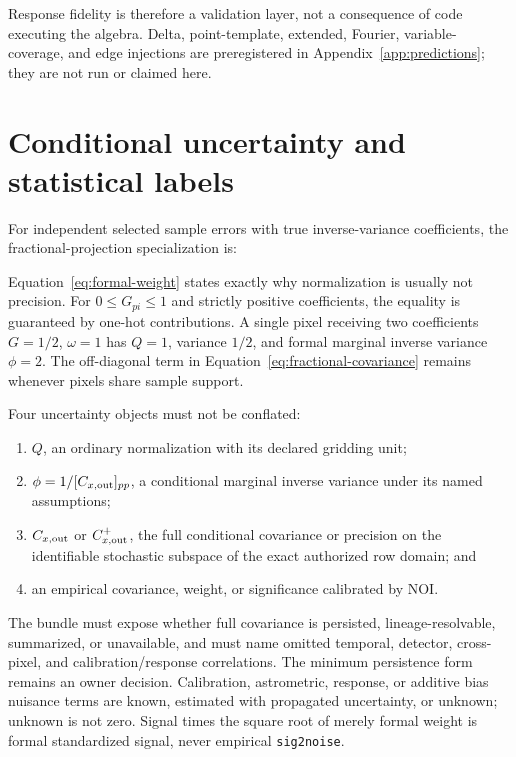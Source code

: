 \documentclass[10pt]{article}
\newcommand{\code}[1]{\nolinkurl{#1}}
\begin{document}
Response fidelity is therefore a validation layer, not a consequence of code
executing the algebra. Delta, point-template, extended, Fourier, variable-
coverage, and edge injections are preregistered in Appendix~\ref{app:predictions};
they are not run or claimed here.

\clearpage
\section{Conditional uncertainty and statistical labels}

For independent selected sample errors with true inverse-variance
coefficients, the fractional-projection specialization is:

\SCIMapFormalWeightEquations

Equation~\eqref{eq:formal-weight} states exactly why normalization is usually
not precision. For \(0\leq G_{pi}\leq1\) and strictly positive coefficients,
the equality is guaranteed by one-hot contributions. A single pixel receiving
two coefficients \(G=1/2\), \(\omega=1\) has \(Q=1\), variance \(1/2\), and
formal marginal inverse variance \(\phi=2\). The off-diagonal term in
Equation~\eqref{eq:fractional-covariance} remains whenever pixels share sample
support.

Four uncertainty objects must not be conflated:

\begin{enumerate}
\item \(Q\), an ordinary normalization with its declared gridding unit;
\item \(\phi=1/[C_{x,{\rm out}}]_{pp}\), a conditional marginal inverse
variance under
its named assumptions;
\item \(C_{x,{\rm out}}\) or \(C_{x,{\rm out}}^+\), the full conditional
covariance or precision on the identifiable stochastic subspace of the exact
authorized row domain; and
\item an empirical covariance, weight, or significance calibrated by NOI.
\end{enumerate}

The bundle must expose whether full covariance is persisted, lineage-resolvable,
summarized, or unavailable, and must name omitted temporal, detector,
cross-pixel, and calibration/response correlations. The minimum persistence
form remains an owner decision. Calibration, astrometric, response, or additive
bias nuisance terms are known, estimated with propagated uncertainty, or
unknown; unknown is not zero. Signal times the square root of merely formal
weight is formal standardized signal, never empirical \code{sig2noise}.
\end{document}

